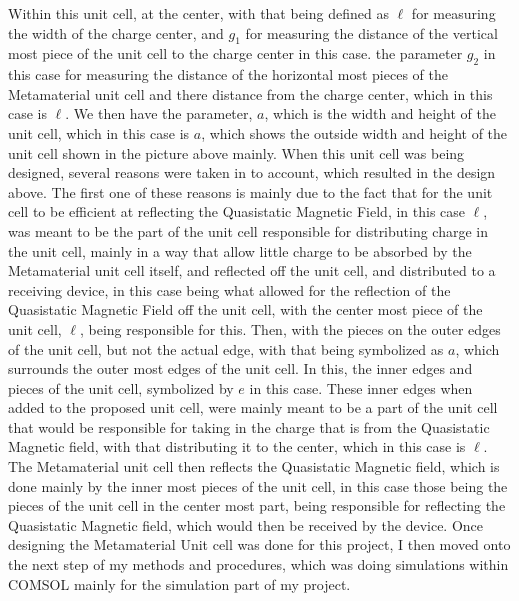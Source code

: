 \documentclass[]{article}
\begin{document}
Within this unit cell, at the center, with that being defined as $\ell$ for measuring the width of the charge center, and $g_1$ for measuring the distance of the vertical most piece of the unit cell to the charge center in this case. the parameter $g_2$ in this case for measuring the distance of the horizontal most pieces of the Metamaterial unit cell and there distance from the charge center, which in this case is $\ell$. We then have the parameter, $a$, which is the width and height of the unit cell, which in this case is $a$, which shows the outside width and height of the unit cell shown in the picture above mainly. When this unit cell was being designed, several reasons were taken in to account, which resulted in the design above. The first one of these reasons is mainly due to the fact that for the unit cell to be efficient at reflecting the Quasistatic Magnetic Field, in this case $\ell$, was meant to be the part of the unit cell responsible for distributing charge in the unit cell, mainly in a way that allow little charge to be absorbed by the Metamaterial unit cell itself, and reflected off the unit cell, and distributed to a receiving device, in this case being what allowed for the reflection of the Quasistatic Magnetic Field off the unit cell, with the center most piece of the unit cell, $\ell$, being responsible for this. Then, with the pieces on the outer edges of the unit cell, but not the actual edge, with that being symbolized as $a$, which surrounds the outer most edges of the unit cell. In this, the inner edges and pieces of the unit cell, symbolized by $e$ in this case. These inner edges when added to the proposed unit cell, were mainly meant to be a part of the unit cell that would be responsible for taking in the charge that is from the Quasistatic Magnetic field, with that distributing it to the center, which in this case is $\ell$. The Metamaterial unit cell then reflects the Quasistatic Magnetic field, which is done mainly by the inner most pieces of the unit cell, in this case those being the pieces of the unit cell in the center most part, being responsible for reflecting the Quasistatic Magnetic field, which would then be received by the device. Once designing the Metamaterial Unit cell was done for this project, I then moved onto the next step of my methods and procedures, which was doing simulations within COMSOL mainly for the simulation part of my project.
\end{document}
